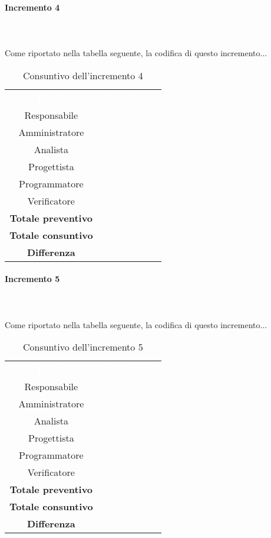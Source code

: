 \paragraph*{Incremento 4} \mbox{} \\ \mbox{} \\
Come riportato nella tabella seguente, la codifica di questo incremento...
\begin{table}[H]
\centering\renewcommand{\arraystretch}{1.5}
\caption{Consuntivo dell'incremento 4}
\vspace{0.2cm}
\begin{tabular}{ c c c }
\rowcolor{redafk}
\textcolor{white}{\textbf{Ruolo}} & \textcolor{white}{\textbf{Ore}} &
\textcolor{white}{\textbf{Costo}}  \\
Responsabile 	&  &  \\
Amministratore 	&  	&  \\
Analista 		&   &  \\
Progettista		&   & \\
Programmatore	&  	& \\
Verificatore 	&  &  \\
\textbf{Totale preventivo} &  &   \\
\textbf{Totale consuntivo} &  &   \\
\rowcolor{lastrowcolor}
\textbf{Differenza} & &  \\
\end{tabular}
\end{table}

\paragraph*{Incremento 5} \mbox{} \\ \mbox{} \\
Come riportato nella tabella seguente, la codifica di questo incremento...
\begin{table}[H]
\centering\renewcommand{\arraystretch}{1.5}
\caption{Consuntivo dell'incremento 5}
\vspace{0.2cm}
\begin{tabular}{ c c c }
\rowcolor{redafk}
\textcolor{white}{\textbf{Ruolo}} & \textcolor{white}{\textbf{Ore}} &
\textcolor{white}{\textbf{Costo}}  \\
Responsabile 	&  &  \\
Amministratore 	&  	&  \\
Analista 		&   &  \\
Progettista		&   & \\
Programmatore	&  	& \\
Verificatore 	&  &  \\
\textbf{Totale preventivo} & &   \\
\textbf{Totale consuntivo} &  &   \\
\rowcolor{lastrowcolor}
\textbf{Differenza} & &  \\
\end{tabular}
\end{table}

